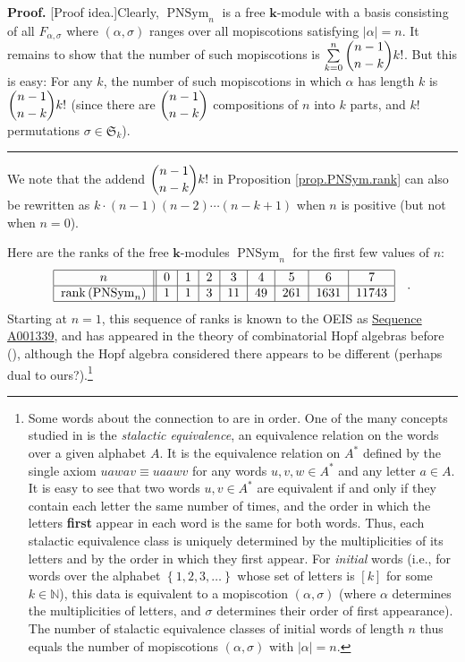 \documentclass[numbers=enddot,12pt,final,onecolumn,notitlepage]{scrartcl}%
\theoremstyle{definition}
\newenvironment{proof}[1][Proof]{\noindent\textbf{#1.} }{\ \rule{0.5em}{0.5em}}
\let\sumnonlimits\sum
\renewcommand{\sum}{\sumnonlimits\limits}
\begin{document}
\begin{proof}
[Proof idea.]Clearly, $\operatorname*{PNSym}\nolimits_{n}$ is a free
$\mathbf{k}$-module with a basis consisting of all $F_{\alpha,\sigma}$ where
$\left(  \alpha,\sigma\right)  $ ranges over all mopiscotions satisfying
$\left\vert \alpha\right\vert =n$. It remains to show that the number of such
mopiscotions is $\sum_{k=0}^{n}\dbinom{n-1}{n-k}k!$. But this is easy: For any
$k$, the number of such mopiscotions in which $\alpha$ has length $k$ is
$\dbinom{n-1}{n-k}k!$ (since there are $\dbinom{n-1}{n-k}$ compositions of $n$
into $k$ parts, and $k!$ permutations $\sigma\in\mathfrak{S}_{k}$).
\end{proof}

We note that the addend $\dbinom{n-1}{n-k}k!$ in Proposition
\ref{prop.PNSym.rank} can also be rewritten as $k\cdot\left(  n-1\right)
\left(  n-2\right)  \cdots\left(  n-k+1\right)  $ when $n$ is positive (but
not when $n=0$).

Here are the ranks of the free $\mathbf{k}$-modules $\operatorname*{PNSym}%
\nolimits_{n}$ for the first few values of $n$:%
\[%
\begin{tabular}
[c]{|c||c|c|c|c|c|c|c|c|}\hline
$n$ & $0$ & $1$ & $2$ & $3$ & $4$ & $5$ & $6$ & $7$\\\hline
$\operatorname*{rank}\left(  \operatorname*{PNSym}\nolimits_{n}\right)  $ &
$1$ & $1$ & $3$ & $11$ & $49$ & $261$ & $1631$ & $11743$\\\hline
\end{tabular}
\ \ \ .
\]
Starting at $n=1$, this sequence of ranks is known to the OEIS as
\href{https://oeis.org/A001339}{Sequence A001339}, and has appeared in the
theory of combinatorial Hopf algebras before (\cite[\S 3.8.3]{HiNoTh06}),
although the Hopf algebra considered there appears to be different (perhaps
dual to ours?).\footnote{Some words about the connection to \cite[\S 3.8.3]%
{HiNoTh06} are in order. One of the many concepts studied in \cite{HiNoTh06}
is the \emph{stalactic equivalence}, an equivalence relation on the words over
a given alphabet $A$. It is the equivalence relation on $A^{\ast}$ defined by
the single axiom $uawav\equiv uaawv$ for any words $u,v,w\in A^{\ast}$ and any
letter $a\in A$. It is easy to see that two words $u,v\in A^{\ast}$ are
equivalent if and only if they contain each letter the same number of times,
and the order in which the letters \textbf{first} appear in each word is the
same for both words. Thus, each stalactic equivalence class is uniquely
determined by the multiplicities of its letters and by the order in which they
first appear. For \emph{initial} words (i.e., for words over the alphabet
$\left\{  1,2,3,\ldots\right\}  $ whose set of letters is $\left[  k\right]  $
for some $k\in\mathbb{N}$), this data is equivalent to a mopiscotion $\left(
\alpha,\sigma\right)  $ (where $\alpha$ determines the multiplicities of
letters, and $\sigma$ determines their order of first appearance). The number
of stalactic equivalence classes of initial words of length $n$ thus equals
the number of mopiscotions $\left(  \alpha,\sigma\right)  $ with $\left\vert
\alpha\right\vert =n$.}
\end{document}
